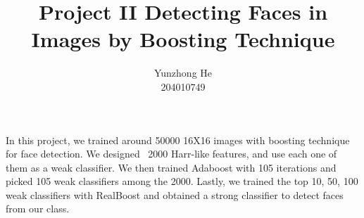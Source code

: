 \documentclass[12pt]{article}
\newenvironment{intro}[2][I Introduction]{\begin{trivlist}
\item[\hskip \labelsep {\bfseries #1}\hskip \labelsep {\bfseries #2}]}{\end{trivlist}}
\begin{document}
 
 
\title{Project II Detecting Faces in Images by Boosting Technique}
\author{Yunzhong He\\ %
204010749} %
 
\maketitle

\begin{intro}{}
\item{}
In this project, we trained around 50000 16X16 images with boosting technique for face detection. We designed ~2000 Harr-like features, and use each one of them as a weak classifier. We then trained Adaboost with 105 iterations and picked 105 weak classifiers among the 2000. Lastly, we trained the top 10, 50, 100 weak classifiers with RealBoost and obtained a strong classifier to detect faces from our class.
\end{intro}
\end{document}
